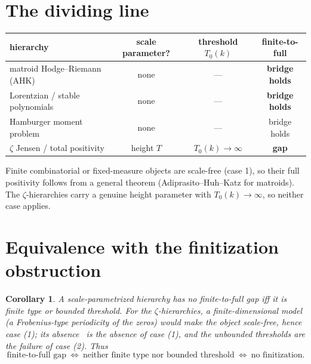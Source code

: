 \documentclass[11pt]{amsart}
\newtheorem{corollary}[theorem]{Corollary}
\theoremstyle{definition}
\theoremstyle{remark}
\begin{document}
\section{The dividing line}
\begin{center}
\begin{tabular}{lccc}
\hline
hierarchy & scale parameter? & threshold $T_0(k)$ & finite-to-full \\
\hline
matroid Hodge--Riemann (AHK) & none & --- & \textbf{bridge holds} \\
Lorentzian / stable polynomials & none & --- & \textbf{bridge holds} \\
Hamburger moment problem & none & --- & bridge holds \\
$\zeta$ Jensen / total positivity & height $T$ & $T_0(k)\to\infty$ & \textbf{gap} \\
\hline
\end{tabular}
\end{center}
Finite combinatorial or fixed-measure objects are scale-free (case 1), so their
full positivity follows from a general theorem (Adiprasito--Huh--Katz for
matroids). The $\zeta$-hierarchies carry a genuine height parameter with
$T_0(k)\to\infty$, so neither case applies.

\section{Equivalence with the finitization obstruction}
\begin{corollary}\label{cor:fin}
A scale-parametrized hierarchy has no finite-to-full gap iff it is finite type or
bounded threshold. For the $\zeta$-hierarchies, a finite-dimensional model (a
Frobenius-type periodicity of the zeros) would make the object scale-free, hence
case (1); its absence~\cite{RP15} is the absence of case (1), and the unbounded
thresholds are the failure of case (2). Thus
\[
\text{finite-to-full gap}\ \Longleftrightarrow\ \text{neither finite type nor bounded threshold}\ \Longleftrightarrow\ \text{no finitization}.
\]
\end{corollary}
\end{document}
